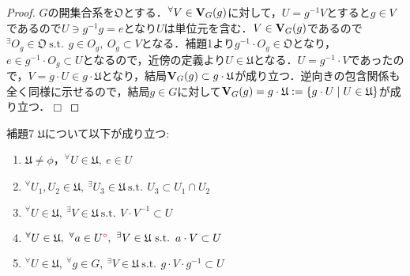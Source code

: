\documentclass[a4paper,11pt]{jsarticle}
\newtheorem{proof}{証明}
\def\qed{\hfill $\Box$}
\newcommand{\st}{\mathrm{s.t.}\,}  %
\begin{document}
\begin{proof}
$G$の開集合系を$\mathfrak{O}$とする．$^\forall V\in {\bf V}_G(g)$に対して，$U=g^{-1}V$とすると$g\in V$であるので$U\ni g^{-1}g=e$となり$U$は単位元を含む．$V\in{\bf V}_G(g)$であるので$^\exists O_g\in\mathfrak{O}{\ }\st{\ }g\in O_g,{\ }O_g\subset V$となる．補題1より$g^{-1}\cdot O_g\in\mathfrak{O}$となり，$e\in g^{-1}\cdot O_g\subset U$となるので，近傍の定義より$U\in\mathfrak{U}$となる．$U=g^{-1}\cdot V$であったので，$V=g\cdot U\in g\cdot\mathfrak{U}$となり，結局${\bf V}_G(g)\subset g\cdot\mathfrak{U}$が成り立つ．逆向きの包含関係も全く同様に示せるので，結局$g\in G$に対して${\bf V}_G(g)=g\cdot\mathfrak{U}:=\{g\cdot U \mid U\in \mathfrak{U}\}$が成り立つ．\qed
\end{proof}
\begin{itembox}[l]{補題7}
$\mathfrak{U}$について以下が成り立つ:
\vspace{-0.7zh}%
\begin{enumerate}
\renewcommand{\labelenumi}{(\arabic{enumi})}
\item $\mathfrak{U}\neq\phi$，$^\forall U\in\mathfrak{U},{\ }e\in U$
\item $^\forall U_1,U_2\in\mathfrak{U},{\ } ^\exists U_3\in\mathfrak{U}{\ }\st{\ }U_3\subset U_1\cap U_2$
\item $^\forall U\in\mathfrak{U},{\ } ^\exists V\in\mathfrak{U}{\ }\st{\ }V\cdot V^{-1}\subset U$
\item $^\forall U\in\mathfrak{U},{\ } ^\forall a\in U\textcolor{red}{ ^\circ},{\ } ^\exists V\in\mathfrak{U}{\ }\st{\ }a\cdot V\subset U$
\item $^\forall U\in\mathfrak{U},{\ } ^\forall g\in G,{\ } ^\exists V\in\mathfrak{U}{\ }\st{\ }g\cdot V\cdot g^{-1}\subset U$
\end{enumerate}
\end{itembox}
\vspace{-1zh}%
\vspace{-1zh}%
\end{document}
